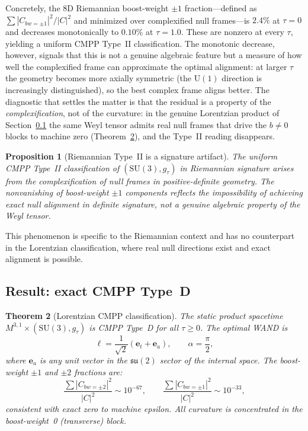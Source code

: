 \documentclass[12pt]{article}
\newtheorem{theorem}{Theorem}
\newtheorem{proposition}[theorem]{Proposition}
\theoremstyle{definition}
\theoremstyle{remark}
\begin{document}
Concretely, the 8D Riemannian boost-weight $\pm1$ fraction---defined as $\sum|C_{bw=\pm1}|^2/|C|^2$ and minimized over complexified null frames---is $2.4\%$ at $\tau=0$ and decreases monotonically to $0.10\%$ at $\tau=1.0$.  These are nonzero at every $\tau$, yielding a uniform CMPP Type~II classification.  The monotonic decrease, however, signals that this is not a genuine algebraic feature but a measure of how well the complexified frame can approximate the optimal alignment: at larger $\tau$ the geometry becomes more axially symmetric (the $\mathrm{U}(1)$ direction is increasingly distinguished), so the best complex frame aligns better.  The diagnostic that settles the matter is that the residual is a property of the \emph{complexification}, not of the curvature: in the genuine Lorentzian product of Section~\ref{subsec:result} the same Weyl tensor admits real null frames that drive the $b\neq0$ blocks to machine zero (Theorem~\ref{thm:lorentzian}), and the Type~II reading disappears.

\begin{proposition}[Riemannian Type~II is a signature artifact]
\label{prop:artifact}
The uniform CMPP Type~II classification of $(\mathrm{SU}(3),g_\tau)$ in Riemannian signature arises from the complexification of null frames in positive-definite geometry.  The nonvanishing of boost-weight $\pm1$ components reflects the impossibility of achieving exact null alignment in definite signature, not a genuine algebraic property of the Weyl tensor.
\end{proposition}

This phenomenon is specific to the Riemannian context and has no counterpart in the Lorentzian classification, where real null directions exist and exact alignment is possible.

\subsection{Result: exact CMPP Type~D}
\label{subsec:result}

\begin{theorem}[Lorentzian CMPP classification]
\label{thm:lorentzian}
The static product spacetime $M^{3,1}\times(\mathrm{SU}(3),g_\tau)$ is CMPP Type~D for all $\tau\geq 0$.  The optimal WAND is
\begin{equation}
\label{eq:wand}
\boldsymbol{\ell} = \frac{1}{\sqrt{2}}(\boldsymbol{e}_t + \boldsymbol{e}_a), \qquad \alpha=\frac{\pi}{2},
\end{equation}
where $\boldsymbol{e}_a$ is any unit vector in the $\mathfrak{su}(2)$ sector of the internal space.  The boost-weight $\pm1$ and $\pm2$ fractions are:
\begin{equation}
\frac{\sum|C_{bw=\pm2}|^2}{|C|^2} \sim 10^{-67}, \qquad \frac{\sum|C_{bw=\pm1}|^2}{|C|^2} \sim 10^{-33},
\end{equation}
consistent with exact zero to machine epsilon.  All curvature is concentrated in the boost-weight~0 (transverse) block.
\end{theorem}
\end{document}
